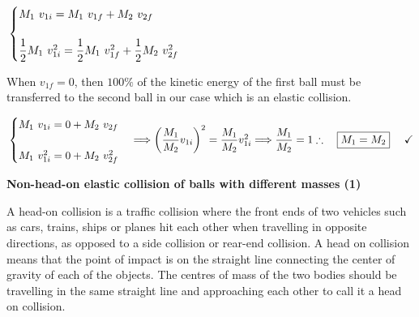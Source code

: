 \documentclass[fleqn]{article}
\begin{document}
$
  \\
  \begin{cases}
    M_1 ~ v_{1i}=M_1 ~ v_{1f}+M_2 ~ v_{2f}  
    \\
    \\
    \dfrac{1}{2} M_1 ~ v_{1i}^2=\dfrac{1}{2} M_1 ~ v_{1f}^2+\dfrac{1}{2} M_2 ~ v_{2f}^2  
  \end{cases}
  \\
  \\
$

When $v_{1f}=0$, then $100\%$ of the kinetic energy of the first ball must be transferred to the second ball in our case 
which is an elastic collision.

$
  \\
  \begin{cases}
    M_1 ~ v_{1i}=0+M_2 ~ v_{2f}  
    \\
    \\
    M_1 ~ v_{1i}^2=0+M_2 ~ v_{2f}^2  
  \end{cases} 
  \Longrightarrow 
  \left(\dfrac{M_1}{M_2} v_{1i} \right)^2=\dfrac{M_1}{M_2} v_{1i}^2
  \Longrightarrow \dfrac{M_1}{M_2}=1
  \\
  \\
  \\
  \therefore ~~~ \boxed{M_1=M_2} ~~~~ \checkmark
  \\
$

\pagebreak

\textbf{Non-head-on elastic collision of balls with different masses (1)}

\vspace{10px}

A head-on collision is a traffic collision where the front ends of two vehicles such as cars, trains, ships or planes 
hit each other when travelling in opposite directions, as opposed to a side collision or rear-end collision.
A head on collision means that the point of impact is on the straight line connecting the center of gravity of each of 
the objects. The centres of mass of the two bodies should be travelling in the same straight line and approaching each other 
to call it a head on collision.
\end{document}
